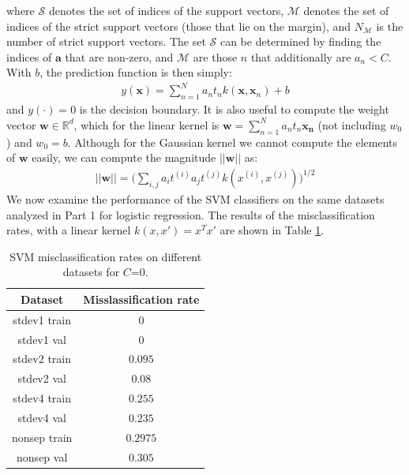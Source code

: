 \documentclass[10pt]{article}
\begin{document}
where $\mathcal{S}$ denotes the set of indices of the support vectors, $\mathcal{M}$ denotes the set of indices of the strict support vectors (those that lie on the margin), and $N_{\mathcal{M}}$ is the number of strict support vectors.  The set $\mathcal{S}$ can be determined by finding the indices of $\mathbf{a}$ that are non-zero, and $\mathcal{M}$ are those $n$ that additionally are $a_n < C$. With $b$, the prediction function is then simply: 
\begin{equation}
\begin{aligned}
y(\mathbf{x}) = \sum_{n=1}^N a_nt_nk(\mathbf{x},\mathbf{x}_n) + b
\end{aligned}
\end{equation}
and $y(\cdot)=0$ is the decision boundary.  It is also useful to compute the weight vector $\mathbf{w} \in \mathbb{R}^d$, which for the linear kernel is $\mathbf{w} = \sum_{n=1}^{N} a_n t_n \mathbf{x_n} $ (not including $w_0$) and $w_0 = b$.  Although for the Gaussian kernel we cannot compute the elements of $\mathbf{w}$ easily, we can compute the magnitude $||\mathbf{w}||$ as:
\begin{equation}
\begin{aligned}
||\mathbf{w}||=\big(\sum_{i,j}a_it^{(i)}a_jt^{(j)} k(x^{(i)}, x^{(j)}) \big)^{1/2}
\end{aligned}
\end{equation}
We now examine the performance of the SVM classifiers on the same datasets analyzed in Part 1 for logistic regression.  The results of the misclassification rates, with a linear kernel $k(x,x') = x^Tx'$ are shown in Table \ref{C_0}.  

\begin{table}[H]
\begin{tabular}{|c|c|}
\hline
\textbf{Dataset} & \textbf{Misslassification rate} \\ \hline
stdev1 train & $0$\\ \hline
stdev1 val & $0$\\ \hline
stdev2 train & $0.095$\\ \hline
stdev2 val & $0.08$\\ \hline
stdev4 train & $0.255$\\ \hline
stdev4 val & $0.235$\\ \hline
nonsep train & $0.2975$\\ \hline
nonsep val & $0.305$\\ \hline
\end{tabular}
\label{C_0}
\caption{SVM misclassification rates on different datasets for $C$=0.}
\end{table}
\end{document}
